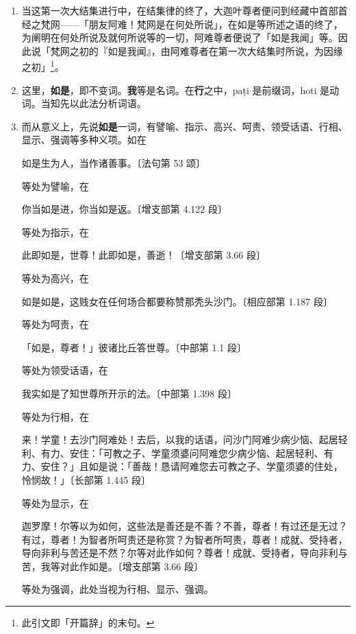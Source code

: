 \begin{enumerate}\item 当这第一次大结集进行中，在结集律的终了，大迦叶尊者便问到经藏中首部首经之梵网——「朋友阿难！梵网是在何处所说」，在如是等所述之语的终了，为阐明在何处所说及就何所说等的一切，阿难尊者便说了「如是我闻」等。因此说「梵网之初的『如是我闻』，由阿难尊者在第一次大结集时所说，为因缘之初」\footnote{此引文即「开篇辞」的末句。}。
\item 这里，\textbf{如是}，即不变词。\textbf{我}等是名词。在\textbf{行}之中，paṭi 是前缀词，hoti 是动词。当知先以此法分析词语。
\item 而从意义上，先说\textbf{如是}一词，有譬喻、指示、高兴、呵责、领受话语、行相、显示、强调等多种义项。如在\begin{quoting}如是生为人，当作诸善事。{\bluefootnotesize 〔法句第 53 颂〕}\end{quoting}等处为譬喻，在\begin{quoting}你当如是进，你当如是返。{\bluefootnotesize 〔增支部第 4.122 段〕}\end{quoting}等处为指示，在\begin{quoting}此即如是，世尊！此即如是，善逝！{\bluefootnotesize 〔增支部第 3.66 段〕}\end{quoting}等处为高兴，在\begin{quoting}如是如是，这贱女在任何场合都要称赞那秃头沙门。{\bluefootnotesize 〔相应部第 1.187 段〕}\end{quoting}等处为呵责，在\begin{quoting}「如是，尊者！」彼诸比丘答世尊。{\bluefootnotesize 〔中部第 1.1 段〕}\end{quoting}等处为领受话语，在\begin{quoting}我实如是了知世尊所开示的法。{\bluefootnotesize 〔中部第 1.398 段〕}\end{quoting}等处为行相，在\begin{quoting}来！学童！去沙门阿难处！去后，以我的话语，问沙门阿难少病少恼、起居轻利、有力、安住：「可教之子、学童须婆问阿难您少病少恼、起居轻利、有力、安住？」且如是说：「善哉！恳请阿难您去可教之子、学童须婆的住处，怜悯故！」{\bluefootnotesize 〔长部第 1.445 段〕}\end{quoting}等处为显示，在\begin{quoting}迦罗摩！尔等以为如何，这些法是善还是不善？不善，尊者！有过还是无过？有过，尊者！为智者所呵责还是称赏？为智者所呵责，尊者！成就、受持者，导向非利与苦还是不然？尔等对此作如何？尊者！成就、受持者，导向非利与苦，我等对此作如是。{\bluefootnotesize 〔增支部第 3.66 段〕}\end{quoting}等处为强调，此处当视为行相、显示、强调。

\end{enumerate}
